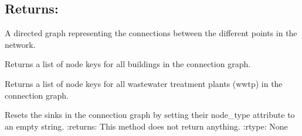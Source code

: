 \documentclass[letterpaper,10pt,english]{sphinxmanual}
\begin{document}
\begin{fulllineitems}
\begin{fulllineitems}
\subsection{Returns:}
\label{\detokenize{pysewer:id16}}\begin{description}
\sphinxAtStartPar
A directed graph representing the connections between the different points in the network.

\end{description}

\end{fulllineitems}


\begin{fulllineitems}
\label{\detokenize{pysewer:pysewer.preprocessing.ModelDomain.get_buildings}}
\pysigstartsignatures
{}
\pysigstopsignatures
\sphinxAtStartPar
Returns a list of node keys for all buildings in the connection graph.

\end{fulllineitems}


\begin{fulllineitems}
\label{\detokenize{pysewer:pysewer.preprocessing.ModelDomain.get_sinks}}
\pysigstartsignatures
{}
\pysigstopsignatures
\sphinxAtStartPar
Returns a list of node keys for all wastewater treatment plants (wwtp) in the connection graph.

\end{fulllineitems}


\begin{fulllineitems}
\label{\detokenize{pysewer:pysewer.preprocessing.ModelDomain.reset_sinks}}
\pysigstartsignatures
{}
\pysigstopsignatures
\sphinxAtStartPar
Resets the sinks in the connection graph by setting their node\_type attribute to an empty string.
:returns: This method does not return anything.
:rtype: None


\end{fulllineitems}
\end{fulllineitems}
\end{document}

